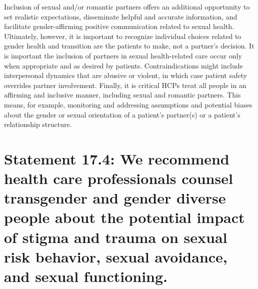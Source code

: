 \documentclass[
]{book}
\begin{document}
Inclusion of sexual and/or romantic partners
offers an additional opportunity to set realistic
expectations, disseminate helpful and accurate
information, and facilitate gender-affirming positive
communication related to sexual health. Ultimately,
however, it is important to recognize individual
choices related to gender health and transition are
the patients to make, not a partner's decision. It
is important the inclusion of partners in sexual
health-related care occur only when appropriate
and as desired by patients. Contraindications might
include interpersonal dynamics that are abusive or
violent, in which case patient safety overrides partner involvement. Finally, it is critical HCPs treat
all people in an affirming and inclusive manner,
including sexual and romantic partners. This
means, for example, monitoring and addressing
assumptions and potential biases about the gender
or sexual orientation of a patient's partner(s) or a
patient's relationship structure.

\hypertarget{statement-17.4-we-recommend-health-care-professionals-counsel-transgender-and-gender-diverse-people-about-the-potential-impact-of-stigma-and-trauma-on-sexual-risk-behavior-sexual-avoidance-and-sexual-functioning.}{%
\section*{Statement 17.4: We recommend health care professionals counsel transgender and gender diverse people about the potential impact of stigma and trauma on sexual risk behavior, sexual avoidance, and sexual functioning.}\label{statement-17.4-we-recommend-health-care-professionals-counsel-transgender-and-gender-diverse-people-about-the-potential-impact-of-stigma-and-trauma-on-sexual-risk-behavior-sexual-avoidance-and-sexual-functioning.}}
\end{document}
